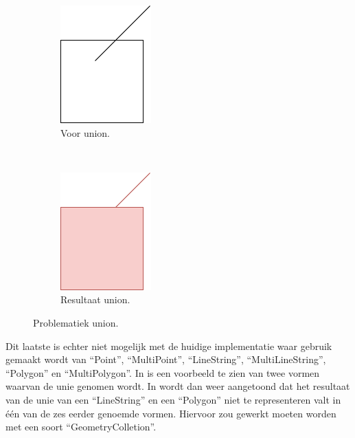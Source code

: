 \begin{figure}
    \centering
    \begin{subfigure}[t]{0.5\linewidth}
        \centering
        \includegraphics[width=0.3\linewidth]{images/union_example1.png}
        \caption{Voor union.}
        \label{fig:union_example1}
    \end{subfigure}%
    ~ 
    \begin{subfigure}[t]{0.5\linewidth}
        \centering
        \includegraphics[width=0.3\linewidth]{images/union_example2.png}
        \caption{Resultaat union.}
        \label{fig:union_example2}
    \end{subfigure}
    \caption{Problematiek union.}
\end{figure}

Dit laatste is echter niet mogelijk met de huidige implementatie waar gebruik gemaakt wordt van ``Point'', ``MultiPoint'', ``LineString'', ``MultiLineString'', ``Polygon'' en ``MultiPolygon''. In  is een voorbeeld te zien van twee vormen waarvan de unie genomen wordt. In  wordt dan weer aangetoond dat het resultaat van de unie van een ``LineString'' en een ``Polygon'' niet te representeren valt in één van de zes eerder genoemde vormen. Hiervoor zou gewerkt moeten worden met een soort ``GeometryColletion''.